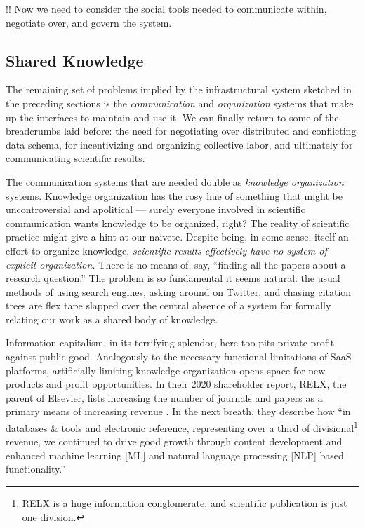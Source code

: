 \documentclass[10pt]{tufte-book}
\begin{document}
!! Now we need to consider the social tools needed to communicate
within, negotiate over, and govern the system.






\subsection{Shared Knowledge}



 The remaining set of problems implied by the
infrastructural system sketched in the preceding sections is the
\emph{communication} and \emph{organization} systems that make up the
interfaces to maintain and use it. We can finally return to some of the
breadcrumbs laid before: the need for negotiating over distributed and
conflicting data schema, for incentivizing and organizing collective
labor, and ultimately for communicating scientific results.

The communication systems that are needed double as \emph{knowledge
organization} systems. Knowledge organization has the rosy hue of
something that might be uncontroversial and apolitical --- surely
everyone involved in scientific communication wants knowledge to be
organized, right? The reality of scientific practice might give a hint
at our naivete. Despite being, in some sense, itself an effort to
organize knowledge, \emph{scientific results effectively have no system
of explicit organization.} There is no means of, say, ``finding all the
papers about a research question.'' The problem is so fundamental it
seems natural: the usual methods of using search engines, asking around
on Twitter, and chasing citation trees are flex tape slapped over the
central absence of a system for formally relating our work as a shared
body of knowledge.

Information capitalism, in its terrifying splendor, here too pits
private profit against public good. Analogously to the necessary
functional limitations of SaaS platforms, artificially limiting
knowledge organization opens space for new products and profit
opportunities. In their 2020 shareholder report, RELX, the parent of
Elsevier, lists increasing the number of journals and papers as a
primary means of increasing revenue \citep{RELXAnnualReport2020} .
In the next breath, they describe how ``in databases \& tools and
electronic reference, representing over a third of divisional\footnote{RELX
  is a huge information conglomerate, and scientific publication is just
  one division.} revenue, we continued to drive good growth through
content development and enhanced machine learning {[}ML{]} and natural
language processing {[}NLP{]} based functionality.''
\end{document}
